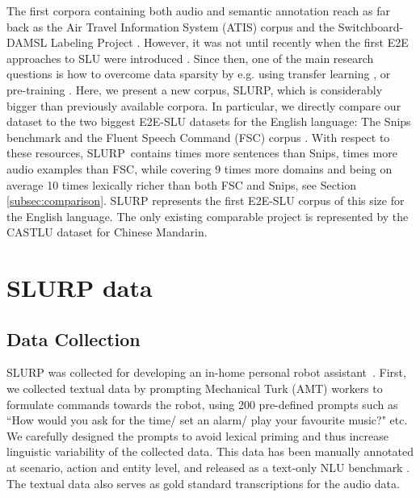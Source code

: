 \documentclass[11pt,a4paper]{article}
\newcommand{\datasetacr}{SLURP}
\newcommand{\etoe}{E2E}
\newcommand{\slu}{SLU}
\begin{document}
The first corpora containing both audio and semantic annotation reach as far back as the Air Travel Information System (ATIS) corpus \cite{Hemphill90:ATIS} and the Switchboard-DAMSL Labeling Project \cite{Jurafsky1997:DASwitchboard}.
However, it was not until recently when the first \etoe{} approaches to \slu{} were introduced \cite{Serdyuk18:towards,Haghani2018:FromAT}. Since then, one of the main research questions is how to overcome data sparsity by e.g. using transfer learning  \cite{Schuster19:facebook, tomashenko:hal-02307811}, or pre-training \cite{lugosh19:Interspeech}.
Here, we present a new corpus, SLURP, which is considerably bigger than previously available corpora. 
In particular, we directly compare our dataset to the two biggest \etoe-\slu{} datasets for the English language: The Snips benchmark \cite{Coucke18:Snips} and the 
Fluent Speech Command (FSC) corpus \cite{lugosh19:Interspeech}.
With respect to these resources, \datasetacr ~contains  times more sentences than Snips,
 times more audio examples than FSC, while covering 9 times more domains and being on average 10 times lexically richer than both FSC and Snips, see Section \ref{subsec:comparison}. SLURP represents the first E2E-SLU corpus of this size for the English language. The only existing comparable project is represented by the CASTLU dataset \cite{10.1145/3340555.3356098} for Chinese Mandarin.






\section{\datasetacr{} data}
\label{sec:dataset}


\subsection{Data Collection}

\datasetacr{} was collected for
developing an in-home personal robot assistant~\cite{miksik2020building}.
First, we collected textual data by prompting Mechanical Turk (AMT) workers to formulate commands towards the robot, using 200 pre-defined prompts such as ``How would you ask for the time/ set an alarm/ play your favourite music?" etc. We carefully designed the prompts to avoid lexical priming and 
thus increase linguistic variability of the collected data. This data has been manually annotated at scenario, action and entity level, and released as a text-only NLU benchmark \cite{liu19:benchmarking}. The textual data also serves as gold standard transcriptions for the audio data.
\end{document}

